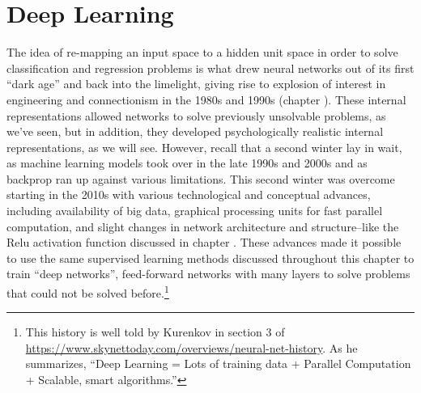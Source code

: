 \chapter{Deep Learning}\label{deepNets}




The idea of re-mapping an input space to a hidden unit space in order to solve classification and regression problems is what drew neural networks out of its first ``dark age'' and back into the limelight, giving rise to explosion of interest in engineering and connectionism in the 1980s and 1990s (chapter ). These internal representations allowed networks to  solve previously unsolvable problems, as we've seen, but in addition, they developed psychologically realistic internal representations, as we will see. However, recall that a second  winter lay in wait, as machine learning models took over in the late 1990s and 2000s and as backprop  ran up against various limitations. This second winter was overcome starting in the 2010s with various technological and conceptual advances, including availability of big data, graphical  processing units for  fast parallel computation, and slight changes in network architecture and structure--like the Relu activation function discussed in chapter . These advances made it possible to use the same supervised learning methods discussed throughout this chapter to train ``deep networks'', feed-forward networks with many layers to solve problems that could not be solved before.\footnote{This history is well told by Kurenkov in section 3 of \url{https://www.skynettoday.com/overviews/neural-net-history}. As he summarizes, ``Deep Learning = Lots of training data + Parallel Computation + Scalable, smart algorithms.''} 

